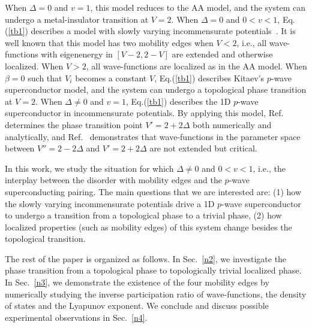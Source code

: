 \documentclass[prb,showpacs,twocolumn,aps,superscriptaddress,a4paper]{revtex4-1}
\begin{document}
When $\Delta = 0$ and $v = 1$, this model reduces to the AA model, and the system can undergo a metal-insulator transition at $V=2$. When $\Delta = 0$ and $0<v<1$, Eq.(\ref{tb1}) describes a model with slowly varying incommensurate potentials~\cite{sarma18}. It is well known that this model has two mobility edges when $V<2$, i.e., all wave-functions with eigenenergy in $[V-2,2-V]$ are extended and otherwise localized. When $V>2$, all wave-functions are localized as in the AA model. When $\beta=0$ such that $V_{i}$ becomes a constant $V$, Eq.(\ref{tb1}) describes Kitaev's $p$-wave superconductor model, and the system can undergo a topological phase transition at $V=2$. When $\Delta \neq 0$ and $v = 1$, Eq.(\ref{tb1}) describes the 1D $p$-wave superconductor in incommensurate potentials. By applying this model, Ref.~\cite{14PRL} determines the phase transition point $V'= 2 + 2 \Delta$ both numerically and analytically, and Ref.~\cite{15PRB} demonstrates that wave-functions in the parameter space between $V''= 2 - 2 \Delta$ and $V'= 2 + 2 \Delta$ are not extended but critical.

In this work, we study the situation for which $\Delta \neq 0$ and $0<v<1$, i.e., the interplay between the disorder with mobility edges and the $p$-wave superconducting pairing. The main questions that we are interested are: (1) how the slowly varying incommensurate potentials drive a 1D $p$-wave superconductor to undergo a transition from a topological phase to a trivial phase, (2) how localized properties (such as mobility edges) of this system change besides the topological transition.

The rest of the paper is organized as follows. In Sec.~\ref{n2}, we investigate the phase transition from a
topological phase to topologically trivial localized phase. In Sec.~\ref{n3}, we demonstrate the existence of the four mobility edges by numerically studying the inverse participation ratio of wave-functions, the density of states and the Lyapunov exponent. We conclude and discuss possible experimental observations  in Sec.~\ref{n4}.
\end{document}
